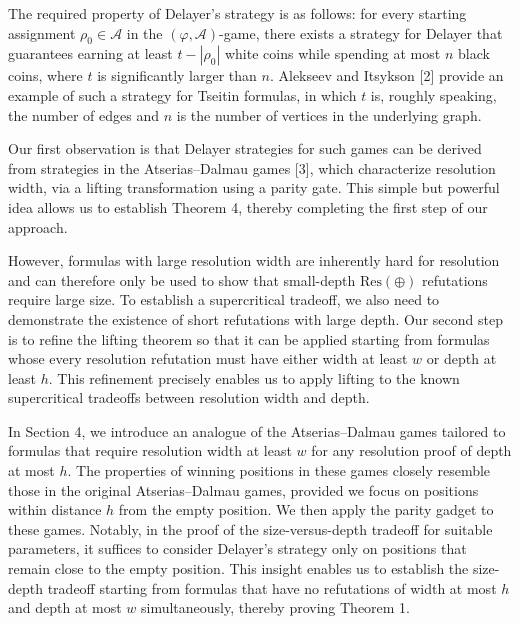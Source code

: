 The required property of Delayer’s strategy is as follows: for every starting assignment $\rho_{0}\in\mathcal{A}$ in the $(\varphi,\mathcal{A})$-game, there exists a strategy for Delayer that guarantees earning at least $t-|\rho_{0}|$ white coins while spending at most $n$ black coins, where $t$ is significantly larger than $n$. Alekseev and Itsykson [2] provide an example of such a strategy for Tseitin formulas, in which $t$ is, roughly speaking, the number of edges and $n$ is the number of vertices in the underlying graph.\par



Our first observation is that Delayer strategies for such games can be derived from strategies in the Atserias–Dalmau games [3], which characterize resolution width, via a lifting transformation using a parity gate. This simple but powerful idea allows us to establish Theorem 4, thereby completing the first step of our approach.\par



However, formulas with large resolution width are inherently hard for resolution and can therefore only be used to show that small-depth $\mathrm{Res}(\oplus)$ refutations require large size. To establish a supercritical tradeoff, we also need to demonstrate the existence of short refutations with large depth. Our second step is to refine the lifting theorem so that it can be applied starting from formulas whose every resolution refutation must have either width at least $w$ or depth at least $h$. This refinement precisely enables us to apply lifting to the known supercritical tradeoffs between resolution width and depth.\par



In Section 4, we introduce an analogue of the Atserias–Dalmau games tailored to formulas that require resolution width at least $w$ for any resolution proof of depth at most $h$. The properties of winning positions in these games closely resemble those in the original Atserias–Dalmau games, provided we focus on positions within distance $h$ from the empty position. We then apply the parity gadget to these games. Notably, in the proof of the size-versus-depth tradeoff for suitable parameters, it suffices to consider Delayer’s strategy only on positions that remain close to the empty position. This insight enables us to establish the size-depth tradeoff starting from formulas that have no refutations of width at most $h$ and depth at most $w$ simultaneously, thereby proving Theorem 1.\par


